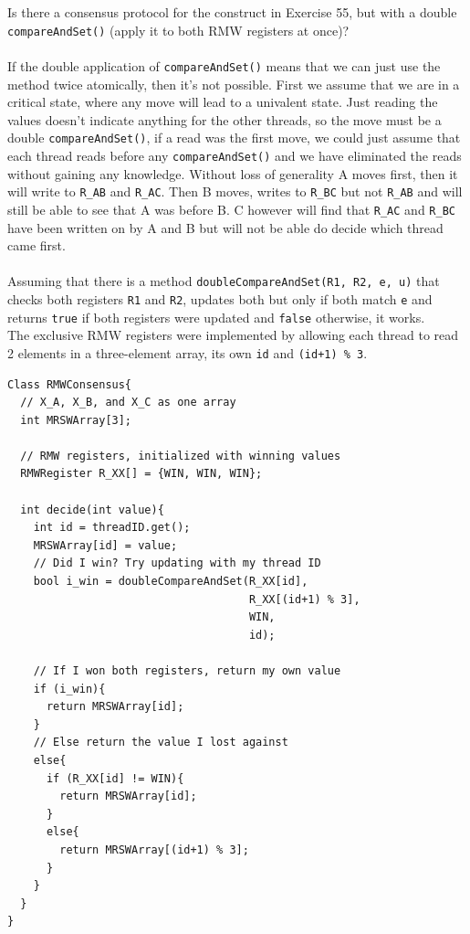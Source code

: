 \documentclass[a4paper,%
11pt,%
DIV=14,
headsepline,%
headings=normal,
]{scrartcl}
\begin{document}
Is there a consensus protocol for the construct in Exercise 55, but with a double \texttt{compareAndSet()} (apply it to both RMW registers at once)?\\
\\
If the double application of \texttt{compareAndSet()} means that we can just use the method twice atomically, then it's not possible. First we assume that we are in a critical state, where any move will lead to a univalent state. Just reading the values doesn't indicate anything for the other threads, so the move must be a double \texttt{compareAndSet()}, if a read was the first move, we could just assume that each thread reads before any \texttt{compareAndSet()} and we have eliminated the reads without gaining any knowledge. Without loss of generality A moves first, then it will write to \texttt{R\_AB} and \texttt{R\_AC}. Then B moves, writes to \texttt{R\_BC} but not \texttt{R\_AB} and will still be able to see that A was before B. C however will find that \texttt{R\_AC} and \texttt{R\_BC} have been written on by A and B but will not be able do decide which thread came first.\\
\\
Assuming that there is a method \texttt{doubleCompareAndSet(R1, R2, e, u)} that checks both registers \texttt{R1} and \texttt{R2}, updates both but only if both match \texttt{e} and returns \texttt{true} if both registers were updated and \texttt{false} otherwise, it works.\\
The exclusive RMW registers were implemented by allowing each thread to read 2 elements in a three-element array, its own \texttt{id} and \texttt{(id+1) \% 3}.

\begin{lstlisting}
Class RMWConsensus{
  // X_A, X_B, and X_C as one array
  int MRSWArray[3];
  
  // RMW registers, initialized with winning values
  RMWRegister R_XX[] = {WIN, WIN, WIN};
  
  int decide(int value){
    int id = threadID.get();
    MRSWArray[id] = value;  
    // Did I win? Try updating with my thread ID
    bool i_win = doubleCompareAndSet(R_XX[id],
                                     R_XX[(id+1) % 3],
                                     WIN,
                                     id);
  	
    // If I won both registers, return my own value
    if (i_win){		
      return MRSWArray[id];
    }
    // Else return the value I lost against
    else{
      if (R_XX[id] != WIN){
        return MRSWArray[id];
      }
      else{
        return MRSWArray[(id+1) % 3];
      }
    }
  }
}
\end{lstlisting}
\end{document}
